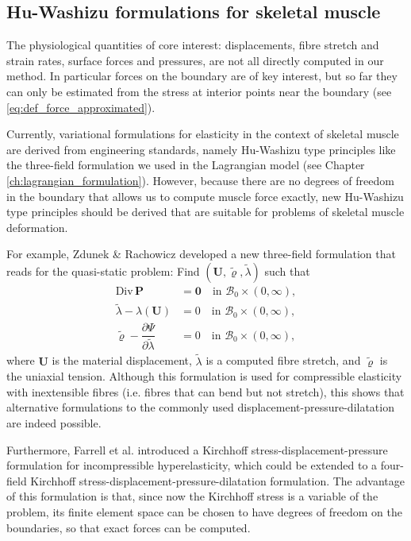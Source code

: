 \documentclass{sfuthesis}
\numberwithin{equation}{section}
\numberwithin{figure}{chapter}
\numberwithin{table}{chapter}
\theoremstyle{definition}
\def\*#1{{\mathbf{#1}}} %
\newcommand{\pder}[2]{\dfrac{\partial #1}{\partial #2}}
\newcommand{\Divt}[1]{{\bm{\mathrm{Div}} \, #1}}
\newcommand{\B}{\mathcal{B}}
\begin{document}
\subsection{Hu-Washizu formulations for skeletal muscle}

The physiological quantities of core interest: displacements, fibre stretch and strain rates, surface forces and pressures, are not all directly computed in our method. In particular forces on the boundary are of key interest, but so far they can only be estimated from the stress at interior points near the boundary (see \eqref{eq:def_force_approximated}).

Currently, variational formulations for elasticity in the context of skeletal muscle are derived from engineering standards, namely Hu-Washizu type principles like the three-field formulation we used in the Lagrangian model (see Chapter \ref{ch:lagrangian_formulation}). However, because there are no degrees of freedom in the boundary that allows us to compute muscle force exactly, new Hu-Washizu type principles should be derived that are suitable for problems of skeletal muscle deformation.

For example, Zdunek \& Rachowicz \cite{ZdunekRachowicz2017} developed a new three-field formulation that reads for the quasi-static problem: Find $(\*U,\widetilde{\varrho},\widetilde{\lambda})$ such that
\begin{subequations}
    \begin{align}
        \Divt{\*P} &= \*0 \quad \text{in } \B_0 \times (0,\infty),\\
        \widetilde{\lambda} - \lambda(\*U) &= 0 \quad \text{in } \B_0 \times (0,\infty), \\
        \widetilde{\varrho} - \pder{\Psi}{\widetilde{\lambda}} &= 0 \quad \text{in } \B_0 \times (0,\infty),
    \end{align}
\end{subequations}
where $\*U$ is the material displacement, $\widetilde{\lambda}$ is a computed fibre stretch, and $\widetilde{\varrho}$ is the uniaxial tension. Although this formulation is used for compressible elasticity with inextensible fibres (i.e. fibres that can bend but not stretch), this shows that alternative formulations to the commonly used displacement-pressure-dilatation are indeed possible.

Furthermore, Farrell et al. \cite{Farrell2021Mixed} introduced a Kirchhoff stress-displacement-pressure formulation for incompressible hyperelasticity, which could be extended to a four-field Kirchhoff stress-displacement-pressure-dilatation formulation. The advantage of this formulation is that, since now the Kirchhoff stress is a variable of the problem, its finite element space can be chosen to have degrees of freedom on the boundaries, so that exact forces can be computed.
\end{document}
